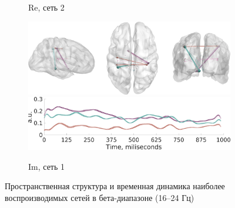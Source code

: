 \documentclass[12pt]{beamer}
\begin{document}
\begin{frame}[t]
\begin{figure}
\begin{subfigure}[b]{0.4\textwidth}
     \caption{Re, сеть 2}\label{fig:12b}
     \end{subfigure}
     \begin{subfigure}[b]{0.4\textwidth}
     \includegraphics[width=\textwidth]{../images/psiicos_paper/Figure12_c1.jpg}
     \includegraphics[width=\textwidth]{../images/psiicos_paper/Figure12_c2.jpg}

     \caption{Im, сеть 1}\label{fig:12c}
     \end{subfigure}
     \caption{Пространственная структура и временная динамика наиболее воспроизводимых сетей в бета-диапазоне (16--24 Гц)}\label{fig:12}
    \end{figure} %
\end{frame}
\end{document}
